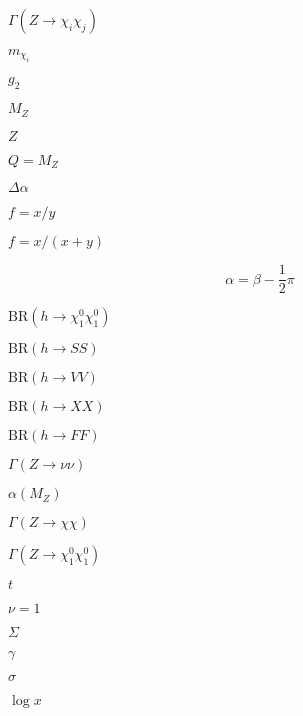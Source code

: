 \documentclass{article}
\begin{document}
$\Gamma(Z \to \chi_i \chi_j)$
\pagebreak

$m_{\chi_i}$
\pagebreak

$g_2$
\pagebreak

$M_Z$
\pagebreak

$Z$
\pagebreak

$Q = M_Z$
\pagebreak

$\Delta\alpha$
\pagebreak

$f = x / y$
\pagebreak

$f = x / (x + y)$
\pagebreak

\[ \alpha = \beta - \frac12 \pi \]
\pagebreak

$\textrm{BR}(h\to\chi^0_1\chi^0_1)$
\pagebreak

$\textrm{BR}(h\to S S)$
\pagebreak

$\textrm{BR}(h\to V V)$
\pagebreak

$\textrm{BR}(h\to X X)$
\pagebreak

$\textrm{BR}(h\to F F)$
\pagebreak

$\Gamma(Z\to\nu\nu)$
\pagebreak

$\alpha(M_Z)$
\pagebreak

$\Gamma(Z\to\chi\chi)$
\pagebreak

$\Gamma(Z\to\chi^0_1\chi^0_1)$
\pagebreak

$t$
\pagebreak

$\nu = 1$
\pagebreak

$\Sigma$
\pagebreak

$\gamma$
\pagebreak

$\sigma$
\pagebreak

$\log x$
\pagebreak
\end{document}

